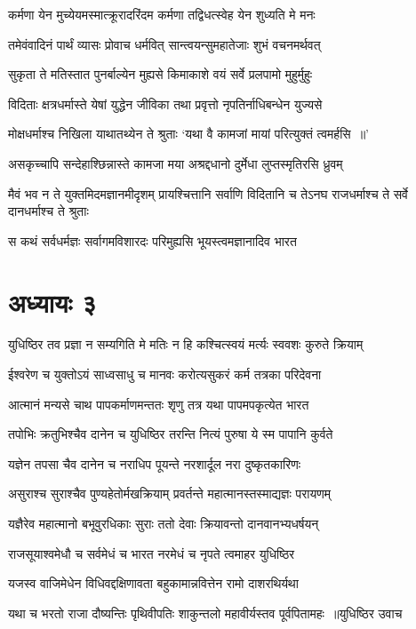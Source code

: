 \twolineshloka
{कर्मणा येन मुच्येयमस्मात्क्रूरादरिंदम}
{कर्मणा तद्विधत्स्वेह येन शुध्यति मे मनः}


\twolineshloka
{तमेवंवादिनं पार्थं व्यासः प्रोवाच धर्मवित्}
{सान्त्वयन्सुमहातेजाः शुभं वचनमर्थवत्}


\twolineshloka
{सुकृता ते मतिस्तात पुनर्बाल्येन मुह्यसे}
{किमाकाशे वयं सर्वे प्रलपामो मुहुर्मुहुः}


\twolineshloka
{विदिताः क्षत्रधर्मास्ते येषां युद्धेन जीविका}
{तथा प्रवृत्तो नृपतिर्नाधिबन्धेन युज्यसे}


\twolineshloka
{मोक्षधर्माश्च निखिला याथातथ्येन ते श्रुताः}
{`यथा वै कामजां मायां परित्युक्तं त्वमर्हसि ॥'}


\twolineshloka
{असकृच्चापि सन्देहाश्छिन्नास्ते कामजा मया}
{अश्रद्दधानो दुर्मेधा लुप्तस्मृतिरसि ध्रुवम्}


मैवं भव न ते युक्तमिदमज्ञानमीदृशम्
\twolineshloka
{प्रायश्चित्तानि सर्वाणि विदितानि च तेऽनघ}
{राजधर्माश्च ते सर्वे दानधर्माश्च ते श्रुताः}


\twolineshloka
{स कथं सर्वधर्मज्ञः सर्वागमविशारदः}
{परिमुह्यसि भूयस्त्वमज्ञानादिव भारत}


\chapter{अध्यायः ३}
\twolineshloka
{युधिष्ठिर तव प्रज्ञा न सम्यगिति मे मतिः}
{न हि कश्चित्स्वयं मर्त्यः स्ववशः कुरुते क्रियाम्}


\twolineshloka
{ईश्वरेण च युक्तोऽयं साध्वसाधु च मानवः}
{करोत्यसुकरं कर्म तत्रका परिदेवना}


\twolineshloka
{आत्मानं मन्यसे चाथ पापकर्माणमन्ततः}
{शृणु तत्र यथा पापमपकृत्येत भारत}


\twolineshloka
{तपोभिः क्रतुभिश्चैव दानेन च युधिष्ठिर}
{तरन्ति नित्यं पुरुषा ये स्म पापानि कुर्वते}


\twolineshloka
{यज्ञेन तपसा चैव दानेन च नराधिप}
{पूयन्ते नरशार्दूल नरा दुष्कृतकारिणः}


\twolineshloka
{असुराश्च सुराश्चैव पुण्यहेतोर्मखक्रियाम्}
{प्रवर्तन्ते महात्मानस्तस्माद्यज्ञः परायणम्}


\twolineshloka
{यज्ञैरेव महात्मानो बभूवुरधिकाः सुराः}
{ततो देवाः क्रियावन्तो दानवानभ्यधर्षयन्}


\twolineshloka
{राजसूयाश्वमेधौ च सर्वमेधं च भारत}
{नरमेधं च नृपते त्वमाहर युधिष्ठिर}


\twolineshloka
{यजस्व वाजिमेधेन विधिवद्दक्षिणावता}
{बहुकामान्नवित्तेन रामो दाशरथिर्यथा}


\threelineshloka
{यथा च भरतो राजा दौष्यन्तिः पृथिवीपतिः}
{शाकुन्तलो महावीर्यस्तव पूर्वपितामहः ॥युधिष्ठिर उवाच}
{}


